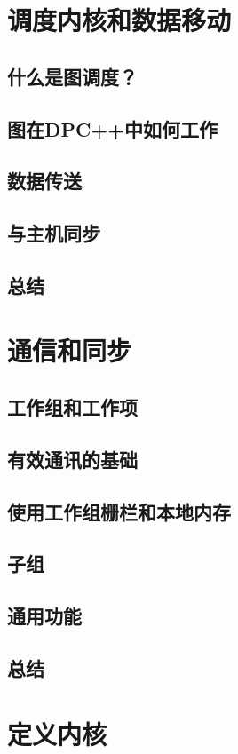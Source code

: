 \documentclass[11pt,a4paper,UTF8]{ctexart}
\begin{document}
	\section{调度内核和数据移动}
		\subsection{什么是图调度？}
		\subsection{图在DPC++中如何工作}
		\subsection{数据传送}
		\subsection{与主机同步}
		\subsection{总结}
	\section{通信和同步}
		\subsection{工作组和工作项}
		\subsection{有效通讯的基础}
		\subsection{使用工作组栅栏和本地内存}
		\subsection{子组}
		\subsection{通用功能}
		\subsection{总结}
	\section{定义内核}
\end{document}
